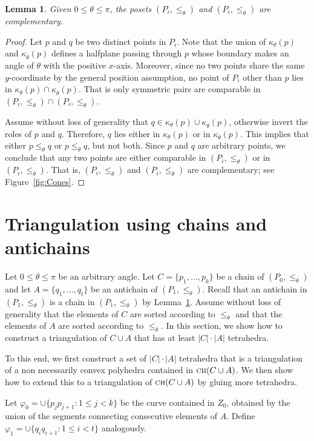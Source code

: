 \documentclass[a4paper, 11pt]{article}
\newtheorem{lemma}[theorem]{Lemma}
\newcommand{\we}{{\ensuremath{\theta}}}
\newcommand{\nwe}{{\ensuremath{\overline{\theta}}}}
\newcommand{\cone}[1]{\ensuremath{\kappa_{\we}(#1)}}
\newcommand{\ncone}[1]{\ensuremath{\kappa_{\nwe}(#1)}}
\newcommand{\ch}[1]{\ensuremath{\textsc{ch}(#1)}}
\newcommand{\lt}{\ensuremath{ \leq_{\theta}}}
\newcommand{\ltc}{\ensuremath{ \leq_{\nwe}}}
\begin{document}
\begin{lemma}\label{lemma:Properties of poset}
Given $0\leq \we\leq \pi$, the posets $(P_i, \lt)$ and $(P_i, \ltc)$  are complementary.
\end{lemma}
\begin{proof}
Let $p$ and $q$ be two distinct points in $P_i$. 
Note that the union of $\cone{p}$ and $\ncone{p}$ defines a halfplane passing through $p$ whose boundary makes an angle of $\we$ with the positive $x$-axis. Moreover, since no two points share the same $y$-coordinate by the general position assumption, no point of $P_i$ other than $p$ lies in $\cone{p}\cap\ncone{p}$. That is only symmetric pairs are comparable in $(P_i, \lt)\cap(P_i, \ltc)$.

Assume without loss of generality that $q\in \cone{p}\cup\ncone{p}$, otherwise invert the roles of $p$ and $q$.
Therefore, $q$ lies either in $\cone{p}$ or in $\ncone{p}$.
This implies that either $p\lt q$ or $p\ltc q$, but not both. 
Since $p$ and $q$ are arbitrary points, we conclude that any two points are either comparable in $(P_i, \lt)$ or in $(P_i, \ltc)$.
That is, $(P_i, \lt)$ and $(P_i, \ltc)$  are complementary; see Figure~\ref{fig:Cones}.
\end{proof}

\section{Triangulation using chains and antichains}
Let $0\leq \theta \leq \pi$ be an arbitrary angle.
Let $C = \{p_1, \ldots, p_k\}$ be a chain of $(P_0, \lt)$ and let $A = \{q_1, \ldots, q_t\}$ be  an antichain of $(P_1, \lt)$.
Recall that an antichain in $(P_1, \lt)$ is a chain in $(P_1, \ltc)$ by Lemma~\ref{lemma:Properties of poset}.
Assume without loss of generality that the elements of $C$ are sorted according to $\lt$ and that the elements of $A$ are sorted according to $\ltc$.
In this section, we show how to construct a triangulation of $C\cup A$ that has at least $|C|\cdot |A|$ tetrahedra.

To this end, we first construct a set of $|C|\cdot|A|$ tetrahedra that is a triangulation of a non necessarily convex polyhedra contained in $\ch{C\cup A}$. We then show how to extend this to a triangulation of $\ch{C\cup A}$ by gluing more tetrahedra.

Let $\varphi_0 = \cup\{p_j p_{j+1} : 1\leq j < k\}$ be the curve contained in $Z_0$, obtained by the union of the segments connecting consecutive elements of $A$. Define $\varphi_1 = \cup\{q_i  q_{i+1} : 1\leq i< t\}$ analogously.
\end{document}
